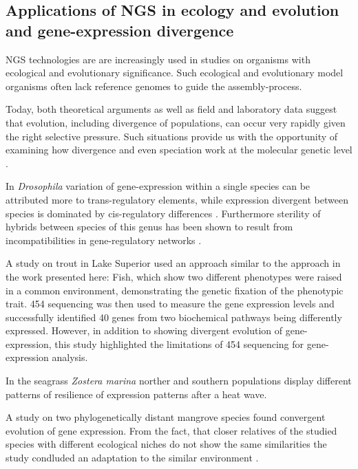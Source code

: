 \subsection{Applications of NGS in ecology and evolution and
  gene-expression divergence}

\label{sec:appl-ngs}

NGS technologies are are increasingly used in studies on organisms
with ecological and evolutionary significance. Such ecological and
evolutionary model organisms often lack reference genomes to guide the
assembly-process.

Today, both theoretical arguments as well as field and laboratory data
suggest that evolution, including divergence of populations, can occur
very rapidly given the right selective pressure. Such situations
provide us with the opportunity of examining how divergence and even
speciation work at the molecular genetic level
\cite{via_ecological_2002}.

In \textit{Drosophila} variation of gene-expression within a single
species can be attributed more to trans-regulatory elements, while
expression divergent between species is dominated by cis-regulatory
differences \cite{pmid20354124}. Furthermore sterility of hybrids
between species of this genus has been shown to result from
incompatibilities in gene-regulatory networks \cite{pmid16757655}.

A study on trout in Lake Superior \cite{pmid20331779} used an approach
similar to the approach in the work presented here: Fish, which show
two different phenotypes were raised in a common environment,
demonstrating the genetic fixation of the phenotypic trait. 454
sequencing was then used to measure the gene expression levels and
successfully identified 40 genes from two biochemical pathways being
differently expressed. However, in addition to showing divergent
evolution of gene-expression, this study highlighted the limitations
of 454 sequencing for gene-expression analysis.

In the seagrass \textit{Zostera marina} norther and southern
populations display different patterns of resilience of expression
patterns after a heat wave.

A study on two phylogenetically distant mangrove species found
convergent evolution of gene expression. From the fact, that closer
relatives of the studied species with different ecological niches do
not show the same similarities the study condluded an adaptation to
the similar environment \cite{dassanayake2009shedding}.


